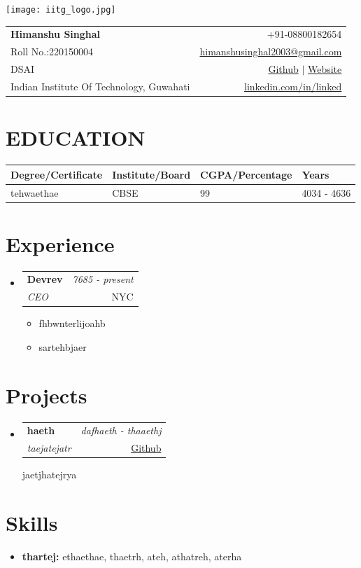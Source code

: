 \documentclass[a4paper,11pt]{article}
\makeatletter
\newcommand{\resumeSubheading}[4]{
\vspace{0.5mm}\item
    \begin{tabular*}{0.98\textwidth}[t]{l@{\extracolsep{\fill}}r}
        \textbf{#1} & \textit{#2} \\
        \textit{#3} & {#4} \\
    \end{tabular*}
    \vspace{-2.4mm}
}
\newcommand{\resumeSubHeadingListStart}{\begin{itemize}[leftmargin=*,labelsep=0mm]}
\newcommand{\resumeItemListStart}{\begin{justify}\begin{itemize}[leftmargin=3ex, rightmargin=2ex, noitemsep,labelsep=1.2mm,itemsep=0mm]\small}
\newcommand{\resumeSubHeadingListEnd}{\end{itemize}\vspace{2mm}}
\newcommand{\resumeItemListEnd}{\end{itemize}\end{justify}\vspace{-2mm}}
\newcommand{\name}{Himanshu Singhal} %
\newcommand{\roll}{220150004} %
\newcommand{\phone}{08800182654} %
\newcommand{\email}{himanshusinghal2003@gmail.com} %
\newcommand{\github}{rghaerhea}%
\newcommand{\website}{tjhq46j} %
\newcommand{\linkedin}{{linked}} %
\makeatother
\begin{document}
\selectfont
\parbox{2.35cm}{%

\texttt{[image: iitg\_logo.jpg]}

}\parbox{\dimexpr\linewidth-2.8cm\relax}{
\begin{tabularx}{\linewidth}{L r}
  \textbf{\LARGE \name} & +91-\phone\\
  {Roll No.:\roll} & \href{mailto:\email}{\email} \\
  DSAI &  \href{https://github.com/\github}{Github} $|$ \href{\website}{Website}\\
  {Indian Institute Of Technology, Guwahati} & \href{https://www.linkedin.com/in/\linkedin/}{linkedin.com/in/\linkedin}
\end{tabularx}
}



\setlength{\tabcolsep}{5pt} %
\section*{\large\textbf{EDUCATION}}
\begin{tabularx}{\textwidth}{|X|X|X|X|}
\hline
\textbf{Degree/Certificate} & \textbf{Institute/Board} & \textbf{CGPA/Percentage} & \textbf{Years} \\
\hline
tehwaethae & CBSE & 99 & 4034 - 4636 \\
\hline
\end{tabularx}


\section{Experience}
\resumeSubHeadingListStart
\resumeSubheading
{ Devrev }{ 7685 - present }
{ CEO }{NYC}
\resumeItemListStart
\item {fhbwnterlijoahb}
\item {sartehbjaer}
\resumeItemListEnd
\resumeSubHeadingListEnd
\vspace{-5.5mm}


\section{Projects}\resumeSubHeadingListStart
\resumeSubheading{haeth}{dafhaeth - thaaethj}{taejatejatr}
{\href{trjrwytjraqj}{Github}}{jaetjhatejrya}
\resumeSubHeadingListEnd



\section{Skills}
\begin{itemize}
\item \textbf{thartej:} ethaethae, thaetrh, ateh, athatreh, aterha
\end{itemize}







\end{document}
